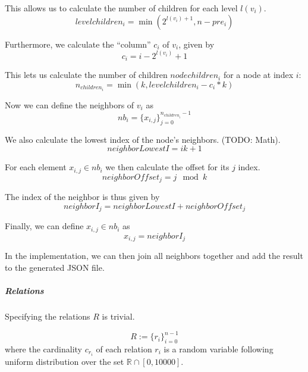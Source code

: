 This allows us to calculate the number of children for each level $l(v_i)$.
\begin{equation}
    levelchildren_i = \min(2^{l(v_i) + 1}, n - pre_i)
\end{equation}

Furthermore, we calculate the ``column'' $c_i$ of $v_i$, given by
\begin{equation}
    c_i = i - 2^{l(v_i)} + 1
\end{equation}

This lets us calculate the number of children $nodechildren_i$ for a node at index $i$:
\begin{equation}
    n_{children_i} = \min(k, levelchildren_i - c_i * k)
\end{equation}

Now we can define the neighbors of $v_i$ as
\begin{equation}
    nb_i = \{ x_{i, j} \}_{j=0}^{n_{children_i} - 1} 
\end{equation}

We also calculate the lowest index of the node's neighbors. (TODO: Math).
\begin{equation}
    neighborLowestI = ik + 1
\end{equation}

For each element $x_{i, j} \in nb_i$ we then calculate the offset for its $j$ index.
\begin{equation}
    neighborOffset_j = j \mod{k}
\end{equation}

The index of the neighbor is thus given by
\begin{equation}
    neighborI_j = neighborLowestI + neighborOffset_j
\end{equation}

Finally, we can define $x_{i, j} \in nb_i$ as
\begin{equation}
    x_{i, j} = neighborI_j
\end{equation}

In the implementation, we can then join all neighbors together and add the result to the generated JSON file.
\begin{equation}
\end{equation}

\subparagraph{Relations}
Specifying the relations $R$ is trivial. 

\begin{equation}
R := \{r_i\}_{i=0}^{n-1}
\end{equation}
where the cardinality $c_{r_i}$ of each relation $r_i$ is a random variable following uniform distribution over the set $\mathbb{R} \cap [0,10000]$.

